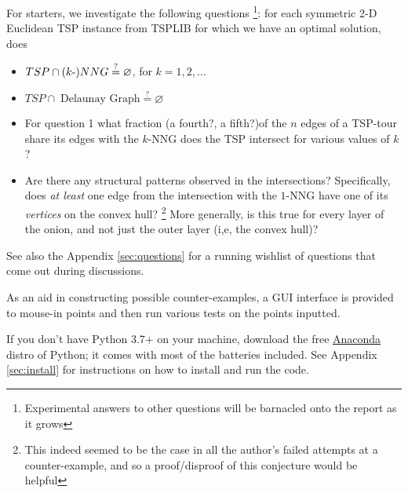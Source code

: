 \begin{description}
     For starters,  we investigate the following questions \footnote{Experimental answers to other questions will be barnacled onto the report as it grows}: 
     for each symmetric 2-D Euclidean TSP instance from TSPLIB for which we have an optimal solution, does

     \begin{itemize}
     \item $TSP \cap (k{\text -})NNG \stackrel{?}{=} \varnothing$, for $k=1,2,\ldots$
     \item $TSP \cap \; \text{Delaunay Graph} \stackrel{?}{=} \varnothing$
     \item For question 1 what fraction (a fourth?, a fifth?)of the $n$ edges of a TSP-tour share its edges with the  $k$-NNG does the TSP intersect for various values of $k$? 
     \item Are there any structural patterns observed in the intersections? Specifically, does \textit{at least } 
           one edge from the intersection with the $1$-NNG have one of its \textit{vertices} on the convex hull? 
           \footnote{This indeed seemed to be the case in all the author's failed attempts at a counter-example, and so a proof/disproof of this conjecture would be helpful}
           More generally, is this true for every layer of the onion, and not just the outer layer (i,e, the convex hull)?
     \end{itemize}

     See also the Appendix \autoref{sec:questions} for a running wishlist of questions that come out during discussions. 

     As an aid in constructing possible counter-examples, a GUI interface is provided to mouse-in points and then 
     run various tests on the points inputted. 
     
     If you don't have  Python 3.7+ on your machine, download the free  \href{https://www.anaconda.com/products/individual}{Anaconda} distro of Python; 
     it comes with most of the batteries included. See Appendix \autoref{sec:install} for instructions on how to install and run the code. 


\end{description}

